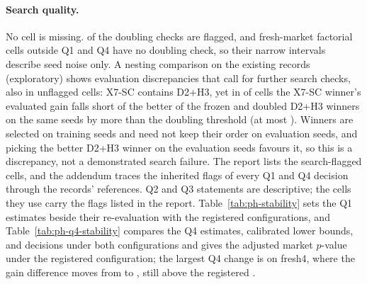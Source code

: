 \documentclass[11pt]{article}
\begin{document}
\paragraph{Search quality.} No cell is missing.  of the  doubling checks are flagged, and fresh-market factorial cells outside Q1 and Q4 have no doubling check, so their narrow intervals describe seed noise only. A nesting comparison on the existing records (exploratory) shows evaluation discrepancies that call for further search checks, also in unflagged cells: X7-SC contains D2+H3, yet in  of  cells the X7-SC winner's evaluated gain falls short of the better of the frozen and doubled D2+H3 winners on the same seeds by more than the doubling threshold (at most ). Winners are selected on training seeds and need not keep their order on evaluation seeds, and picking the better D2+H3 winner on the evaluation seeds favours it, so this is a discrepancy, not a demonstrated search failure. The report lists the search-flagged cells, and the addendum traces the inherited flags of every Q1 and Q4 decision through the records' references. Q2 and Q3 statements are descriptive; the cells they use carry the flags listed in the report. Table~\ref{tab:ph-stability} sets the Q1 estimates beside their re-evaluation with the registered configurations, and Table~\ref{tab:ph-q4-stability} compares the Q4 estimates, calibrated lower bounds, and decisions under both configurations and gives the adjusted market $p$-value under the registered configuration; the largest Q4 change is on fresh4, where the gain difference moves from  to , still above the registered .
\begin{table}[t]\centering\small
{}
\caption{The Q1 differences from the report beside their re-evaluation with the registered fresh-market configurations (frozen policies and references).}\label{tab:ph-stability}
\end{table}

\begin{table}[t]\centering\small
{}
\caption{Q4 per market from the report (``report'') beside the re-evaluation with the registered fresh-market configurations (``reg.''): gain difference and efficiency with their calibrated lower bounds, the Holm-adjusted market value under the registered configurations, and both decisions (frozen policies and references).}\label{tab:ph-q4-stability}
\end{table}
\end{document}
